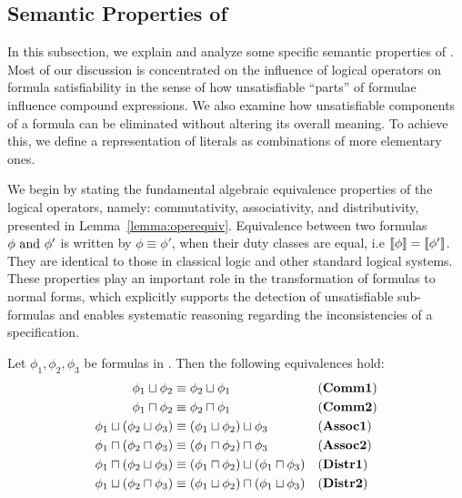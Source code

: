 \subsection{Semantic Properties of \TDDLfm}

 In this subsection, we explain and analyze some specific semantic properties of \TDDLfm. Most of our discussion is concentrated on the influence of logical operators on formula satisfiability in the sense of how unsatisfiable ``parts'' of formulae influence compound expressions. We also examine how unsatisfiable components of a formula can be eliminated without altering its overall meaning. To achieve this, we define a representation of literals as combinations of more elementary ones.


We begin by stating the fundamental algebraic equivalence properties of the logical operators, namely: commutativity, associativity, and distributivity, presented in Lemma~\ref{lemma:operequiv}. Equivalence between two formulas $\phi \text{ and } \phi'$ is written by $\phi \equiv \phi'$, when their duty classes are equal, i.e $\llbracket \phi \rrbracket= \llbracket \phi' \rrbracket$. They are identical to those in classical logic and other standard logical systems. These properties play an important role in the transformation of formulas to normal forms, which explicitly supports the detection of unsatisfiable sub-formulas and enables systematic reasoning regarding the inconsistencies of a specification.

\begin{lemma} \label{lemma:operequiv}
Let $\phi_1, \phi_2, \phi_3$ be formulas in \TDDLfm. Then the following equivalences hold:
\begin{align*}
    \phi_1 \sqcup \phi_2 &\equiv  \phi_2 \sqcup \phi_1 && \text{(\textbf{Comm1})} \\
    \phi_1 \sqcap \phi_2 &\equiv  \phi_2 \sqcap \phi_1 && \text{(\textbf{Comm2})} \\
    \phi_1 \sqcup (\phi_2 \sqcup \phi_3) &\equiv  (\phi_1 \sqcup \phi_2) \sqcup \phi_3 && \text{(\textbf{Assoc1})} \\
    \phi_1 \sqcap (\phi_2 \sqcap \phi_3) &\equiv  (\phi_1 \sqcap \phi_2) \sqcap \phi_3 && \text{(\textbf{Assoc2})} \\
    \phi_1 \sqcap (\phi_2 \sqcup \phi_3) &\equiv  (\phi_1 \sqcap \phi_2) \sqcup (\phi_1 \sqcap \phi_3) && \text{(\textbf{Distr1})} \\
    \phi_1 \sqcup (\phi_2 \sqcap \phi_3) &\equiv  (\phi_1 \sqcup \phi_2) \sqcap (\phi_1 \sqcup \phi_3) && \text{(\textbf{Distr2})}
\end{align*}
\end{lemma}

